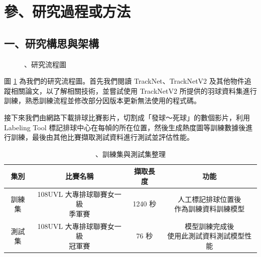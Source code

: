 \section{參、研究過程或方法}

\subsection{一、研究構思與架構}
\begin{figure}[H]
    \centering
    \caption{、研究流程圖}
    \label{研究流程圖}
\end{figure}

圖 \ref{研究流程圖} 為我們的研究流程圖。首先我們閱讀 TrackNet、TrackNetV2 及其他物件追蹤相關論文，以了解相關技術，並嘗試使用 TrackNetV2 所提供的羽球資料集進行訓練，熟悉訓練流程並修改部分因版本更新無法使用的程式碼。

接下來我們由網路下載排球比賽影片，切割成「發球～死球」的數個影片，利用 Labeling Tool 標記排球中心在每幀的所在位置，然後生成熱度圖等訓練數據後進行訓練，最後由其他比賽擷取測試資料進行測試並評估性能。

\begin{table}[H]
    \centering
    \caption{、訓練集與測試集整理}
    \label{訓練集與測試集整理}
    \begin{tabular}{cccc}
        \hline
        \textbf{集別} & \textbf{比賽名稱} & \textbf{擷取長度} & \textbf{功能}\\
        \hline
        訓練集 & \makecell[c]{108UVL 大專排球聯賽女一級\\季軍賽} & 1240 秒 & \makecell[c]{人工標記排球位置後\\作為訓練資料訓練模型}\\
        \hline
        測試集 & \makecell[c]{108UVL 大專排球聯賽女一級\\冠軍賽} & 76 秒 & \makecell[c]{模型訓練完成後\\使用此測試資料測試模型性能}\\
        \hline
    \end{tabular}
\end{table}

